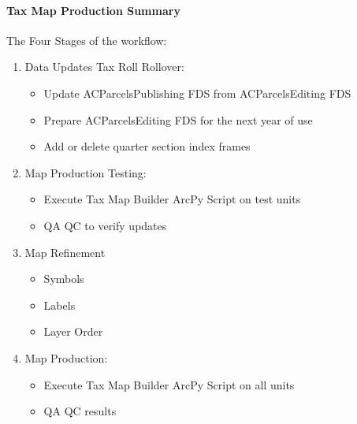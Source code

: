 \paragraph{Tax Map Production Summary}
\vspace{.25in}

The {\LARGE Four Stages} of the workflow:
\vspace{.25in}

\begin{enumerate}
\item {\Large Data Updates} {\normalsize Tax Roll Rollover}:
\begin{itemize}
\item Update ACParcelsPublishing FDS from ACParcelsEditing FDS
\item Prepare ACParcelsEditing FDS for the next year of use 
\item Add or delete quarter section index frames
\end{itemize}
\item {\Large Map Production Testing:}
\begin{itemize}
\item Execute Tax Map Builder ArcPy Script on test units
\item QA QC to verify updates
\end{itemize}
\item {\Large Map Refinement}
\begin{itemize}
\item Symbols
\item Labels
\item Layer Order
\end{itemize}
\item {\Large Map Production:}
\begin{itemize}
\item Execute Tax Map Builder ArcPy Script on all units
\item QA QC results
\end{itemize}
\end{enumerate}
\clearpage
